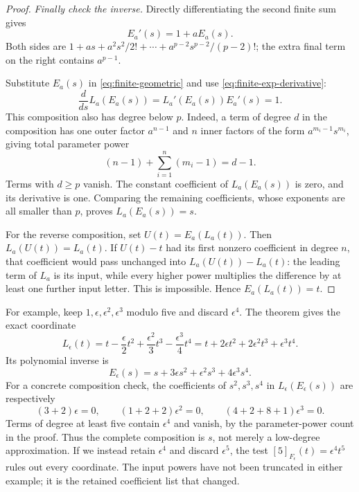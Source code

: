 \begin{proof}
\emph{Finally check the inverse.} Directly differentiating the second finite sum gives
\begin{equation}\label{eq:finite-exp-derivative}
 E_a'(s)=1+aE_a(s).
\end{equation}
Both sides are \(1+as+a^2s^2/2!+\cdots+a^{p-2}s^{p-2}/(p-2)!\); the extra final term on the right contains \(a^{p-1}\).

Substitute \(E_a(s)\) in \eqref{eq:finite-geometric} and use \eqref{eq:finite-exp-derivative}:
\[
 \frac{d}{ds}L_a(E_a(s))
 =L_a'(E_a(s))E_a'(s)=1.
\]
This composition also has degree below \(p\). Indeed, a term of degree \(d\) in the composition has one outer factor \(a^{n-1}\) and \(n\) inner factors of the form \(a^{m_i-1}s^{m_i}\), giving total parameter power
\[
 (n-1)+\sum_{i=1}^{n}(m_i-1)=d-1.
\]
Terms with \(d\ge p\) vanish. The constant coefficient of \(L_a(E_a(s))\) is zero, and its derivative is one. Comparing the remaining coefficients, whose exponents are all smaller than \(p\), proves \(L_a(E_a(s))=s\).

For the reverse composition, set \(U(t)=E_a(L_a(t))\). Then \(L_a(U(t))=L_a(t)\). If \(U(t)-t\) had its first nonzero coefficient in degree \(n\), that coefficient would pass unchanged into \(L_a(U(t))-L_a(t)\): the leading term of \(L_a\) is its input, while every higher power multiplies the difference by at least one further input letter. This is impossible. Hence \(E_a(L_a(t))=t\).
\end{proof}

For example, keep \(1,\epsilon,\epsilon^2,\epsilon^3\) modulo five and discard \(\epsilon^4\). The theorem gives the exact coordinate
\[
 L_\epsilon(t)=t-\frac{\epsilon}{2}t^2
 +\frac{\epsilon^2}{3}t^3-\frac{\epsilon^3}{4}t^4
 =t+2\epsilon t^2+2\epsilon^2t^3+\epsilon^3t^4.
\]
Its polynomial inverse is
\[
 E_\epsilon(s)=s+3\epsilon s^2+\epsilon^2s^3+4\epsilon^3s^4.
\]
For a concrete composition check, the coefficients of \(s^2,s^3,s^4\) in \(L_\epsilon(E_\epsilon(s))\) are respectively
\[
 (3+2)\epsilon=0,\qquad
 (1+2+2)\epsilon^2=0,\qquad
 (4+2+8+1)\epsilon^3=0.
\]
Terms of degree at least five contain \(\epsilon^4\) and vanish, by the parameter-power count in the proof. Thus the complete composition is \(s\), not merely a low-degree approximation.
If we instead retain \(\epsilon^4\) and discard \(\epsilon^5\), the test \([5]_{F_\epsilon}(t)=\epsilon^4t^5\) rules out every coordinate. The input powers have not been truncated in either example; it is the retained coefficient list that changed.

